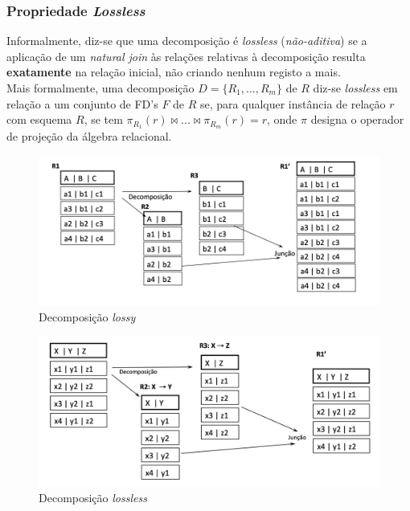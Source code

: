\documentclass[oneside]{book}
\theoremstyle{definition}
\begin{document}

\subsubsection*{Propriedade \textit{Lossless}}

Informalmente, diz-se que uma decomposição é \textit{lossless} (\textit{não-aditiva}) se a aplicação de um \textit{natural join} às relações relativas à decomposição resulta \textbf{exatamente} na relação inicial, não criando nenhum registo a mais.\\
Mais formalmente, uma decomposição $D = \{ R_1, ..., R_m\}$ de $R$ diz-se \textit{lossless} em relação a um conjunto de FD's $F$ de $R$ se, para qualquer instância de relação $r$ com esquema $R$, se tem  $\pi_{R_1}(r) \bowtie  ... \bowtie \pi_{R_m}(r) = r$, onde $\pi$ designa o operador de projeção da álgebra relacional.

\begin{figure}[h]
    \centering
    \includegraphics[scale = 0.75]{cap_norm/lossy.png}
    \caption{Decomposição \textit{lossy}}
\end{figure}

\begin{figure}[h]
    \centering
    \includegraphics[scale = 0.75]{cap_norm/lossless.png}
    \caption{Decomposição \textit{lossless}}
\end{figure}
\end{document}

